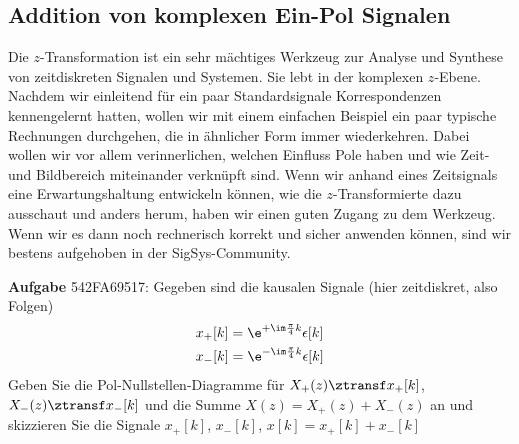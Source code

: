 \subsection{Addition von komplexen Ein-Pol Signalen}
\label{sec:542FA69517}
\begin{Ziel}
Die $z$-Transformation ist ein sehr mächtiges Werkzeug zur Analyse und Synthese
von zeitdiskreten Signalen und Systemen. Sie lebt in der komplexen $z$-Ebene.
Nachdem wir einleitend für ein paar Standardsignale Korrespondenzen
kennengelernt hatten, wollen wir mit einem einfachen Beispiel ein paar
typische Rechnungen durchgehen, die in ähnlicher Form immer wiederkehren.
Dabei wollen wir vor allem verinnerlichen, welchen Einfluss Pole haben
und wie Zeit- und Bildbereich miteinander verknüpft sind. Wenn wir anhand
eines Zeitsignals eine Erwartungshaltung entwickeln können, wie die $z$-Transformierte
dazu ausschaut und anders herum, haben wir einen guten Zugang zu dem Werkzeug.
Wenn wir es dann noch rechnerisch korrekt und sicher anwenden können, sind wir
bestens aufgehoben in der SigSys-Community.
\end{Ziel}
\textbf{Aufgabe} {\tiny 542FA69517}:
Gegeben sind die kausalen Signale (hier zeitdiskret, also Folgen)
\begin{align}
&x_+[k]=\e^{+\im\frac{\pi}{4} k} \epsilon[k]\\
&x_-[k]=\e^{-\im\frac{\pi}{4} k} \epsilon[k]
\end{align}
Geben Sie die Pol-Nullstellen-Diagramme für
$X_+(z) \ztransf x_+[k]$,
$X_-(z) \ztransf x_-[k]$ und die Summe
$X(z) = X_+(z) + X_-(z)$ an und skizzieren Sie die Signale
$x_+[k]$, $x_-[k]$, $x[k]=x_+[k]+x_-[k]$

